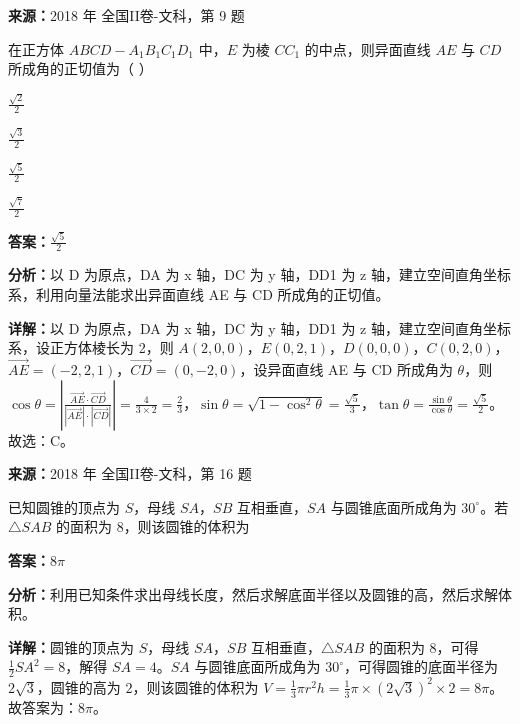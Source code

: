 \begin{question}[points=5]
\textbf{来源：}2018 年 全国II卷-文科，第 9 题\par
在正方体 $ABCD-A_1B_1C_1D_1$ 中，$E$ 为棱 $CC_1$ 的中点，则异面直线 $AE$ 与 $CD$ 所成角的正切值为（ ）
\begin{choices}
  \item $\frac{\sqrt{2}}{2}$
  \item $\frac{\sqrt{3}}{2}$
  \item $\frac{\sqrt{5}}{2}$
  \item $\frac{\sqrt{7}}{2}$
\end{choices}
\begin{solution}
\textbf{答案：}$\frac{\sqrt{5}}{2}$

\textbf{分析：}以 D 为原点，DA 为 x 轴，DC 为 y 轴，DD1 为 z 轴，建立空间直角坐标系，利用向量法能求出异面直线 AE 与 CD 所成角的正切值。

\textbf{详解：}以 D 为原点，DA 为 x 轴，DC 为 y 轴，DD1 为 z 轴，建立空间直角坐标系，设正方体棱长为 2，则 $A(2,0,0)$，$E(0,2,1)$，$D(0,0,0)$，$C(0,2,0)$，$\overrightarrow{AE}=(-2,2,1)$，$\overrightarrow{CD}=(0,-2,0)$，设异面直线 AE 与 CD 所成角为 $\theta$，则 $\cos\theta=|\frac{\overrightarrow{AE}\cdot\overrightarrow{CD}}{|\overrightarrow{AE}|\cdot|\overrightarrow{CD}|}|=\frac{4}{3\times2}=\frac{2}{3}$，$\sin\theta=\sqrt{1-\cos^2\theta}=\frac{\sqrt{5}}{3}$，$\tan\theta=\frac{\sin\theta}{\cos\theta}=\frac{\sqrt{5}}{2}$。故选：C。
\end{solution}
\end{question}

\begin{question}[points=5]
\textbf{来源：}2018 年 全国II卷-文科，第 16 题\par
已知圆锥的顶点为 $S$，母线 $SA$，$SB$ 互相垂直，$SA$ 与圆锥底面所成角为 $30^\circ$。若 $\triangle SAB$ 的面积为 $8$，则该圆锥的体积为
\fillin[{$8\pi$}]
\begin{solution}
\textbf{答案：}$8\pi$

\textbf{分析：}利用已知条件求出母线长度，然后求解底面半径以及圆锥的高，然后求解体积。

\textbf{详解：}圆锥的顶点为 $S$，母线 $SA$，$SB$ 互相垂直，$\triangle SAB$ 的面积为 $8$，可得 $\frac{1}{2}SA^2=8$，解得 $SA=4$。$SA$ 与圆锥底面所成角为 $30^\circ$，可得圆锥的底面半径为 $2\sqrt{3}$，圆锥的高为 $2$，则该圆锥的体积为 $V=\frac{1}{3}\pi r^2h=\frac{1}{3}\pi\times(2\sqrt{3})^2\times2=8\pi$。故答案为：$8\pi$。
\end{solution}
\end{question}

